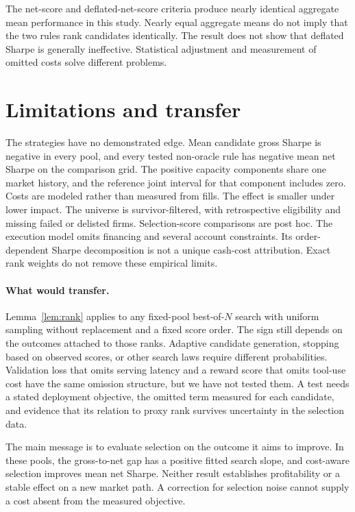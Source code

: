 \documentclass{article}
\begin{document}
The net-score and deflated-net-score criteria produce nearly identical aggregate mean performance in this study. Nearly equal aggregate means do not imply that the two rules rank candidates identically. The result does not show that deflated Sharpe is generally ineffective. Statistical adjustment and measurement of omitted costs solve different problems.

\section{Limitations and transfer}
The strategies have no demonstrated edge. Mean candidate gross Sharpe is negative in every pool, and every tested non-oracle rule has negative mean net Sharpe on the comparison grid. The positive capacity components share one market history, and the reference joint interval for that component includes zero. Costs are modeled rather than measured from fills. The effect is smaller under lower impact. The universe is survivor-filtered, with retrospective eligibility and missing failed or delisted firms. Selection-score comparisons are post hoc. The execution model omits financing and several account constraints. Its order-dependent Sharpe decomposition is not a unique cash-cost attribution. Exact rank weights do not remove these empirical limits.

\paragraph{What would transfer.}
Lemma~\ref{lem:rank} applies to any fixed-pool best-of-$N$ search with uniform sampling without replacement and a fixed score order. The sign still depends on the outcomes attached to those ranks. Adaptive candidate generation, stopping based on observed scores, or other search laws require different probabilities. Validation loss that omits serving latency and a reward score that omits tool-use cost have the same omission structure, but we have not tested them. A test needs a stated deployment objective, the omitted term measured for each candidate, and evidence that its relation to proxy rank survives uncertainty in the selection data.

The main message is to evaluate selection on the outcome it aims to improve. In these pools, the gross-to-net gap has a positive fitted search slope, and cost-aware selection improves mean net Sharpe. Neither result establishes profitability or a stable effect on a new market path. A correction for selection noise cannot supply a cost absent from the measured objective.
\end{document}
